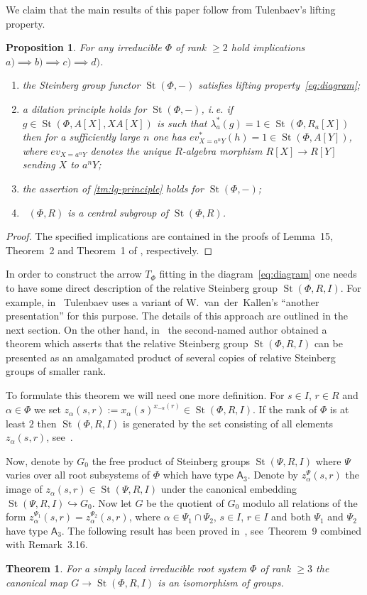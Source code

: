 \documentclass[11pt]{amsart}
\theoremstyle{plain} \declaretheorem[name=Theorem, Refname={Theorem,Theorems}]{tm} \Crefname{tm}{Theorem}{Theorems}
\numberwithin{equation}{section}
\newtheorem{prop}[lm]{Proposition} \Crefname{prop}{Proposition}{Propositions}
\newtheorem*{tm*}{Theorem}
\theoremstyle{definition} \newtheorem{df}[lm]{Definition} \Crefname{df}{Definition}{Definitions}
\theoremstyle{remark} \newtheorem{rk}[lm]{Remark} \Crefname{rk}{Remark}{Remarks}
\newcommand{\St}{\mathop{\mathrm{St}}\nolimits}
\newcommand{\Kt}{\mathop{\mathrm{K_2}}\nolimits}
\newcommand{\rA}{\mathsf{A}}
\begin{document}
We claim that the main results of this paper follow from Tulenbaev's lifting property.
\begin{prop} For any irreducible $\Phi$ of rank $\geq 2$ hold implications $a) \implies b) \implies c) \implies d)$.
\begin{enumerate}
 \item the Steinberg group functor $\St(\Phi, -)$ satisfies lifting property~\eqref{eq:diagram};
 \item a dilation principle holds for $\St(\Phi, -)$, i.\,e. if $g\in\St(\Phi, A[X], XA[X])$ is such that $\lambda_a^*(g) = 1 \in \St(\Phi, R_a[X])$ then
       for a sufficiently large $n$ one has $ev_{X = a^n Y}^*(h) = 1 \in \St(\Phi, A[Y])$, where $ev_{X=a^n Y}$ denotes the unique $R$-algebra morphism $R[X]\to R[Y]$ sending $X$ to $a^nY$;
 \item the assertion of \cref{tm:lg-principle} holds for $\St(\Phi, -)$;
 \item $\Kt(\Phi, R)$ is a central subgroup of $\St(\Phi, R)$.
\end{enumerate} \end{prop}
\begin{proof} The specified implications are contained in the proofs of Lemma~15, Theorem~2 and Theorem~1 of \cite{SCh}, respectively. \end{proof}
     
In order to construct the arrow $T_\Phi$ fitting in the diagram~\eqref{eq:diagram} one needs to have some direct description of the relative Steinberg group $\St(\Phi, R, I)$.
For example, in~\cite{Tul} Tulenbaev uses a variant of W.~van~der~Kallen's ``another presentation'' for this purpose. The details of this approach are outlined in the next section.
On the other hand, in~\cite{SCh} the second-named author obtained a theorem which asserts that the relative Steinberg group $\St(\Phi, R, I)$ can be presented as an amalgamated product of
several copies of relative Steinberg groups of smaller rank. 

To formulate this theorem we will need one more definition.
For $s\in I$, $r\in R$ and $\alpha\in \Phi$ we set $z_\alpha(s, r) := x_\alpha(s)^{x_{-\alpha}(r)} \in \St(\Phi, R, I)$.
If the rank of $\Phi$ is at least $2$ then $\St(\Phi, R, I)$ is generated by the set consisting of all elements $z_\alpha(s,r)$, see~\cite[Lemma~5]{SCh}.

Now, denote by $G_0$ the free product of Steinberg groups $\St(\Psi, R, I)$ where $\Psi$ varies over all root subsystems of $\Phi$ which have type $\rA_3$.
Denote by $z_\alpha^\Psi(s,r)$ the image of $z_\alpha(s,r)\in\St(\Psi, R, I)$ under the canonical embedding $\St(\Psi, R, I) \hookrightarrow G_0$.
Now let $G$ be the quotient of $G_0$ modulo all relations of the form $z_\alpha^{\Psi_1}(s, r) = z_\alpha^{\Psi_2}(s, r)$, where $\alpha\in\Psi_1\cap\Psi_2$, $s\in I$, $r\in I$ 
and both $\Psi_1$ and $\Psi_2$ have type $\rA_3$.
The following result has been proved in~\cite{SCh}, see~Theorem~9 combined with Remark~3.16.
\begin{tm*} \label{tm:relPres} For a simply laced irreducible root system $\Phi$ of rank $\geq 3$ the canonical map $G \rightarrow \St(\Phi, R, I)$ is an isomorphism of groups.
\end{tm*}
\end{document}
